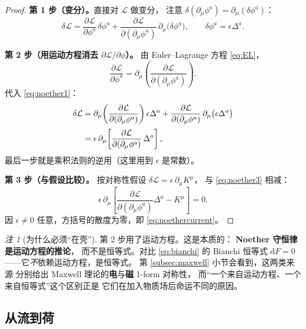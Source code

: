 \documentclass[UTF8,a4paper,11pt]{ctexart}
\theoremstyle{plain}
\theoremstyle{definition}
\theoremstyle{remark}
\newtheorem{remark}{注}[section]
\newcommand{\ext}{\mathrm{d}}          %
\newcommand{\Lag}{\mathcal{L}}
\newcommand{\PD}[2]{\frac{\partial #1}{\partial #2}}
\begin{document}
\begin{proof}
\textbf{第 1 步（变分）。}直接对 $\Lag$ 做变分，
注意 $\delta(\partial_\mu\phi^a)=\partial_\mu(\delta\phi^a)$：
\begin{equation}
  \delta\Lag
  =\PD{\Lag}{\phi^a}\,\delta\phi^a
  +\PD{\Lag}{(\partial_\mu\phi^a)}\,\partial_\mu\big(\delta\phi^a\big),
  \qquad \delta\phi^a=\epsilon\Delta^a .
  \label{eq:noether1}
\end{equation}

\textbf{第 2 步（用运动方程消去 $\partial\Lag/\partial\phi$）。}
由 Euler--Lagrange 方程 \eqref{eq:EL}，
\begin{equation}
  \PD{\Lag}{\phi^a}
  =\partial_\mu\!\left(\PD{\Lag}{(\partial_\mu\phi^a)}\right).
  \label{eq:noether2}
\end{equation}
代入 \eqref{eq:noether1}：
\begin{align}
  \delta\Lag
  &=\partial_\mu\!\left(\PD{\Lag}{(\partial_\mu\phi^a)}\right)\epsilon\Delta^a
   +\PD{\Lag}{(\partial_\mu\phi^a)}\,\partial_\mu\big(\epsilon\Delta^a\big)
  \notag\\[2pt]
  &=\epsilon\,\partial_\mu\!\left[
    \PD{\Lag}{(\partial_\mu\phi^a)}\,\Delta^a\right],
  \label{eq:noether3}
\end{align}
最后一步就是乘积法则的逆用（这里用到 $\epsilon$ 是常数）。

\textbf{第 3 步（与假设比较）。}
按对称性假设 $\delta\Lag=\epsilon\,\partial_\mu K^\mu$，
与 \eqref{eq:noether3} 相减：
\begin{equation}
  \epsilon\,\partial_\mu\!\left[
  \PD{\Lag}{(\partial_\mu\phi^a)}\Delta^a-K^\mu\right]=0 .
\end{equation}
因 $\epsilon\ne0$ 任意，方括号的散度为零，即 \eqref{eq:noethercurrent}。
\end{proof}

\begin{remark}[为什么必须“在壳”]
第 2 步用了运动方程。这是本质的：
\textbf{Noether 守恒律是运动方程的推论}，
而不是恒等式。对比 \eqref{eq:bianchi} 的 Bianchi 恒等式
$\ext F=0$——它\emph{不}依赖运动方程，是恒等式。
第 \ref{subsec:maxwell} 小节会看到，这两类来源
分别给出 Maxwell 理论的\textbf{电}与\textbf{磁} 1-form 对称性，
而“一个来自运动方程、一个来自恒等式”这个区别正是
它们在加入物质场后命运不同的原因。
\end{remark}

\subsection{从流到荷}
\label{subsec:charge}
\end{document}
